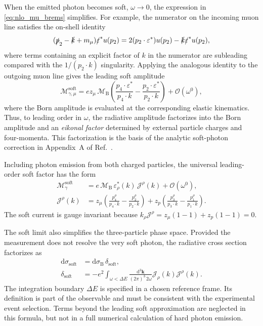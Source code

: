 When the emitted photon becomes soft, $\omega\to0$, the expression in
\autoref{eq:nlo_mu_brems} simplifies. For example, the numerator on the
incoming muon line satisfies the on-shell identity
\begin{equation}
 (\slashed p_2-\slashed k+m_\mu)\slashed\varepsilon^*u(p_2)
 =2(p_2\cdot\varepsilon^*)u(p_2)
  -\slashed k\slashed\varepsilon^*u(p_2),
 \label{eq:nlo_soft_numerator}
\end{equation}
where terms containing an explicit factor of $k$ in the numerator are
subleading compared with the $1/(p_2\cdot k)$ singularity.
Applying the analogous identity to the outgoing muon line gives the leading
soft amplitude
\begin{equation}
 \mathcal M_{\gamma,\mu}^{\mathrm{soft}}
   =ez_\mu\,\mathcal M_{\mathrm B}
    \left(\frac{p_4\cdot\varepsilon^*}{p_4\cdot k}
          -\frac{p_2\cdot\varepsilon^*}{p_2\cdot k}\right)
    +\mathcal O(\omega^0),
 \label{eq:nlo_soft_amplitude_mu}
\end{equation}
where the Born amplitude is evaluated at the corresponding elastic
kinematics. Thus, to leading order in $\omega$, the radiative amplitude
factorizes into the Born amplitude and an \emph{eikonal factor} determined by
external particle charges and four-momenta. This factorization is the basis
of the analytic soft-photon correction in Appendix~A of
Ref.~\cite{Vanderhaeghen2000}.

Including photon emission from both charged particles, the universal
leading-order soft factor has the form
\begin{align}
 \mathcal M_{\gamma}^{\mathrm{soft}}
  &=e\,\mathcal M_{\mathrm B}\,
      \varepsilon_\rho^*(k)\,\mathcal J^\rho(k)
      +\mathcal O(\omega^0),\\
 \mathcal J^\rho(k)
  &=z_\mu\!\left(\frac{p_4^\rho}{p_4\cdot k}
                    -\frac{p_2^\rho}{p_2\cdot k}\right)
    +z_p\!\left(\frac{p_3^\rho}{p_3\cdot k}
                    -\frac{p_1^\rho}{p_1\cdot k}\right).
 \label{eq:nlo_soft_current_full}
\end{align}
The soft current is gauge invariant because
$k_\rho\mathcal J^\rho=z_\mu(1-1)+z_p(1-1)=0$.

The soft limit also simplifies the three-particle phase space. Provided the
measurement does not resolve the very soft photon, the radiative cross
section factorizes as
\begin{align}
 \mathrm d\sigma_{\mathrm{soft}}
  &=\mathrm d\sigma_{\mathrm B}\,\delta_{\mathrm{soft}},\\
 \delta_{\mathrm{soft}}
  &=-e^2\!
    \int_{\omega<\Delta E}\!\frac{\mathrm d^3\boldsymbol k}{(2\pi)^3\,2\omega}
     \mathcal J_\rho(k)\mathcal J^\rho(k).
 \label{eq:nlo_soft_integral}
\end{align}
The integration boundary $\Delta E$ is specified in a chosen reference
frame. Its definition is part of the observable and must be consistent with
the experimental event selection. Terms beyond the leading soft
approximation are neglected in this formula, but not in a full numerical
calculation of hard photon emission.

